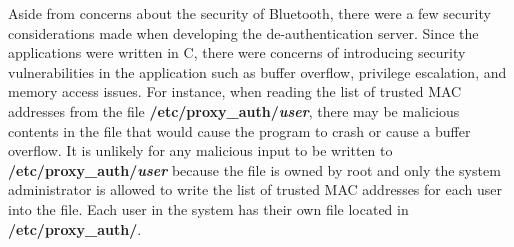 \documentclass[letterpaper,twocolumn,10pt]{article}
\begin{document}
{{Aside from concerns about the security of Bluetooth, there were a few security considerations made when developing the de-authentication server. Since the applications were written in C, there were concerns of introducing security vulnerabilities in the application such as buffer overflow, privilege escalation, and memory access issues. For instance, when reading the list of trusted MAC addresses from the file \textbf{/etc/proxy\_auth/\emph{user}}, there may be malicious contents in the file that would cause the program to crash or cause a buffer overflow. It is unlikely for any malicious input to be written to \textbf{/etc/proxy\_auth/\emph{user}} because the file is owned by root and only the system administrator is allowed to write the list of trusted MAC addresses for each user into the file. Each user in the system has their own file located in \textbf{/etc/proxy\_auth/}.
}}
\end{document}
